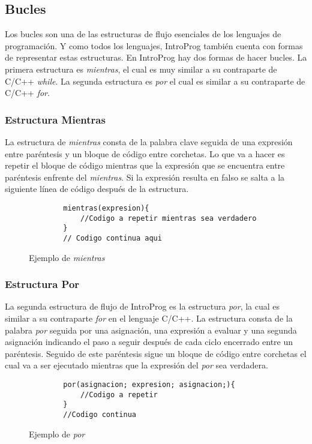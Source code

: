 \FloatBarrier
\subsection{Bucles}

Los bucles son una de las estructuras de flujo esenciales de los lenguajes de programación. Y como todos los lenguajes, IntroProg también cuenta con formas de representar estas estructuras. En IntroProg hay dos formas de hacer bucles. La primera estructura es \emph{mientras}, el cual es muy similar a su contraparte de C/C++ \emph{while}. La segunda estructura es \emph{por} el cual es similar a su contraparte de C/C++ \emph{for}.
\\
\subsubsection{Estructura Mientras}
La estructura de \emph{mientras} consta de la palabra clave seguida de una expresión entre paréntesis y un bloque de código entre corchetas. Lo que va a hacer es repetir el bloque de código mientras que la expresión que se encuentra entre paréntesis enfrente del \emph{mientras}. Si la expresión resulta en falso se salta a la siguiente línea de código después de la estructura.

\begin{figure}[!htbp]
    \centering
    
    \begin{lstlisting}
        mientras(expresion){
            //Codigo a repetir mientras sea verdadero
        }
        // Codigo continua aqui
    \end{lstlisting}
    \caption{Ejemplo de \emph{mientras}}
\end{figure}
\FloatBarrier

\subsubsection{Estructura Por}
La segunda estructura de flujo de IntroProg es la estructura \emph{por}, la cual es similar a su contraparte \emph{for} en el lenguaje C/C++. La estructura consta de la palabra \emph{por} seguida por una asignación, una expresión a evaluar y una segunda asignación indicando el paso a seguir después de cada ciclo encerrado entre un paréntesis. Seguido de este paréntesis sigue un bloque de código entre corchetas el cual va a ser ejecutado mientras que la expresión del \emph{por} sea verdadera.

\begin{figure}[!htbp]
    \centering
    
    \begin{lstlisting}
        por(asignacion; expresion; asignacion;){
            //Codigo a repetir
        }
        //Codigo continua
    \end{lstlisting}
    \caption{Ejemplo de \emph{por}}
\end{figure}
\FloatBarrier

